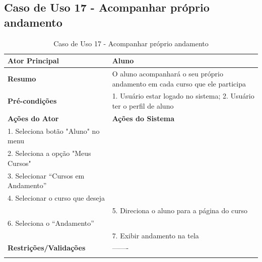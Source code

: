 \subsection{Caso de Uso 17 - Acompanhar próprio andamento}
\label{sc:case17}
\begin{center}
\begin{longtable}{p{8cm}|p{8cm}}
    \hline
    \textbf{Ator Principal} & Aluno \\
    \hline
    \textbf{Resumo} & O aluno acompanhará o seu próprio andamento em cada curso que ele participa \\
    \hline
    \textbf{Pr\'{e}-condi\c{c}\~{o}es} & 1. Usuário estar logado no sistema; 2. Usuário ter o perfil de aluno \\
    \hline
    \textbf{A\c{c}\~{o}es do Ator} & \textbf{A\c{c}\~{o}es do Sistema} \\
    \hline
    1. Seleciona botão "Aluno" no menu \\
    \hline
    2. Seleciona a opção "Meus Cursos" \\
	\hline
    3. Selecionar “Cursos em Andamento” \\
	\hline
    4. Selecionar o curso que deseja  \\
    \hline
    & 5. Direciona o aluno para a página do curso \\
	\hline
    6. Seleciona o “Andamento” \\
	\hline
    & 7. Exibir andamento na tela \\
    \hline
    \hline
    \textbf{Restri\c{c}\~{o}es/Valida\c{c}\~{o}es} & -------\\
\hline
\caption{Caso de Uso 17 - Acompanhar próprio andamento}
\end{longtable}
\end{center}

